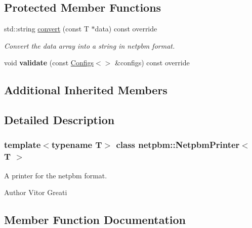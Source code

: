 \subsection*{Protected Member Functions}
\begin{DoxyCompactItemize}
\item 
std\+::string \mbox{\hyperlink{classnetpbm_1_1_netpbm_printer_a0bc962be71fd453792743af6cb676da2}{convert}} (const T $\ast$data) const override
\begin{DoxyCompactList}\small\item\em Convert the data array into a string in netpbm format. \end{DoxyCompactList}\item 
\mbox{\label{classnetpbm_1_1_netpbm_printer_aa14fc5595a1bc158e532b0955ba133a1}} 
void {\bfseries validate} (const \mbox{\hyperlink{class_configs}{Configs}}$<$$>$ \&configs) const override
\end{DoxyCompactItemize}
\subsection*{Additional Inherited Members}


\subsection{Detailed Description}
\subsubsection*{template$<$typename T$>$\newline
class netpbm\+::\+Netpbm\+Printer$<$ T $>$}

A printer for the netpbm format. 

\begin{DoxyAuthor}{Author}
Vitor Greati 
\end{DoxyAuthor}


\subsection{Member Function Documentation}
\mbox{\label{classnetpbm_1_1_netpbm_printer_a0bc962be71fd453792743af6cb676da2}} 
